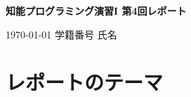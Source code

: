 \documentclass{jarticle}
\begin{document}

\begin{center} 
{\large \bf 知能プログラミング演習I 第4回レポート}
\end{center} %

\begin{flushright} 
\today %
\hskip 1mm
学籍番号 %
\hskip 1mm
氏名 %
\end{flushright} %

\section{レポートのテーマ}




\end{document}
